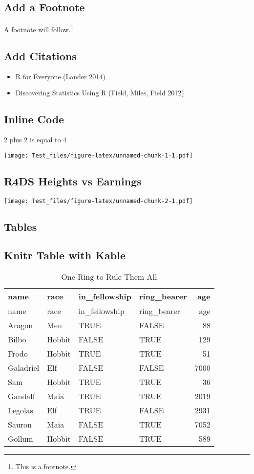 \documentclass[
]{article}
\providecommand{\tightlist}{%
  \setlength{\itemsep}{0pt}\setlength{\parskip}{0pt}}
\begin{document}
\hypertarget{add-a-footnote}{%
\subsection{Add a Footnote}\label{add-a-footnote}}

A footnote will follow.\footnote{This is a footnote.}

\hypertarget{add-citations}{%
\subsection{Add Citations}\label{add-citations}}

\begin{itemize}
\tightlist
\item
  R for Everyone (Lander 2014)
\item
  Discovering Statistics Using R (Field, Miles, Field 2012)
\end{itemize}

\hypertarget{inline-code}{%
\subsection{Inline Code}\label{inline-code}}

2 plus 2 is equal to 4

\texttt{[image: Test\_files/figure-latex/unnamed-chunk-1-1.pdf]}

\hypertarget{r4ds-heights-vs-earnings}{%
\subsection{R4DS Heights vs Earnings}\label{r4ds-heights-vs-earnings}}

\texttt{[image: Test\_files/figure-latex/unnamed-chunk-2-1.pdf]}

\hypertarget{tables}{%
\subsection{Tables}\label{tables}}

\hypertarget{knitr-table-with-kable}{%
\subsection{Knitr Table with Kable}\label{knitr-table-with-kable}}

\begin{longtable}[]{@{}llllr@{}}
\caption{One Ring to Rule Them All}\tabularnewline
\toprule
name & race & in\_fellowship & ring\_bearer & age\tabularnewline
\midrule
\endfirsthead
\toprule
name & race & in\_fellowship & ring\_bearer & age\tabularnewline
\midrule
\endhead
Aragon & Men & TRUE & FALSE & 88\tabularnewline
Bilbo & Hobbit & FALSE & TRUE & 129\tabularnewline
Frodo & Hobbit & TRUE & TRUE & 51\tabularnewline
Galadriel & Elf & FALSE & FALSE & 7000\tabularnewline
Sam & Hobbit & TRUE & TRUE & 36\tabularnewline
Gandalf & Maia & TRUE & TRUE & 2019\tabularnewline
Legolas & Elf & TRUE & FALSE & 2931\tabularnewline
Sauron & Maia & FALSE & TRUE & 7052\tabularnewline
Gollum & Hobbit & FALSE & TRUE & 589\tabularnewline
\bottomrule
\end{longtable}
\end{document}
